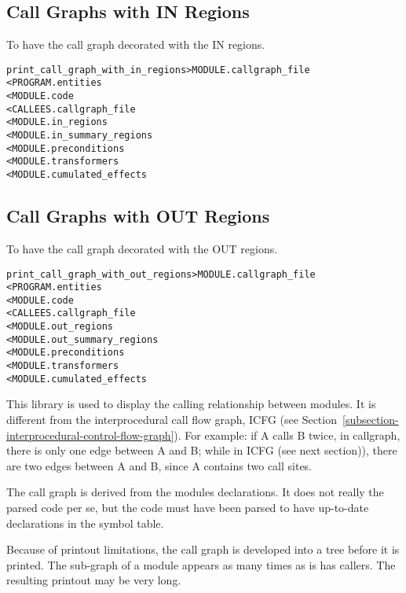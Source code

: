 \documentclass[a4paper]{report}
\newenvironment{PipsMake}{\begin{alltt}}{\end{alltt}}
\begin{document}
\subsection{Call Graphs with IN Regions}

To have the call graph decorated with the IN regions.
\begin{PipsMake}
print_call_graph_with_in_regions         > MODULE.callgraph_file
        < PROGRAM.entities
        < MODULE.code
        < CALLEES.callgraph_file
        < MODULE.in_regions
        < MODULE.in_summary_regions
        < MODULE.preconditions
        < MODULE.transformers
        < MODULE.cumulated_effects
\end{PipsMake}

\subsection{Call Graphs with OUT Regions}

To have the call graph decorated with the OUT regions.
\begin{PipsMake}
print_call_graph_with_out_regions        > MODULE.callgraph_file
        < PROGRAM.entities
        < MODULE.code
        < CALLEES.callgraph_file
        < MODULE.out_regions
        < MODULE.out_summary_regions
        < MODULE.preconditions
        < MODULE.transformers
        < MODULE.cumulated_effects
\end{PipsMake}

This library is used to display the calling relationship between modules.
It is different from the interprocedural call flow graph, ICFG (see
Section~\ref{subsection-interprocedural-control-flow-graph}). For example:
if A calls B twice, in callgraph, there is only one edge between A and B;
while in ICFG (see next section)), there are two edges between A and B,
since A contains two call sites.

The call graph is derived from the modules declarations. It does not
really the parsed code per se, but the code must have been parsed to have
up-to-date declarations in the symbol table.

Because of printout limitations, the call graph is developed into a tree
before it is printed. The sub-graph of a module appears as many times as
is has callers. The resulting printout may be very long.
\end{document}
